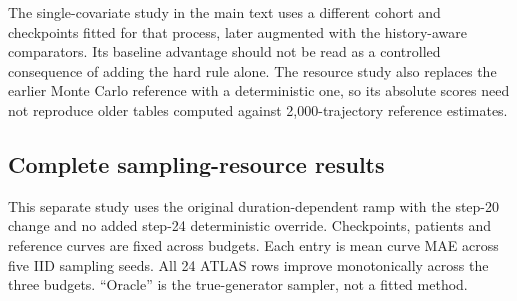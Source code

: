 The single-covariate study in the main text uses a different cohort and checkpoints fitted for that process, later augmented with the history-aware comparators. Its baseline advantage should not be read as a controlled consequence of adding the hard rule alone. The resource study also replaces the earlier Monte Carlo reference with a deterministic one, so its absolute scores need not reproduce older tables computed against 2,000-trajectory reference estimates.

\clearpage
\subsection{Complete sampling-resource results}\label{app:budgetresults}
This separate study uses the original duration-dependent ramp with the step-20 change and no added step-24 deterministic override. Checkpoints, patients and reference curves are fixed across budgets. Each entry is mean curve MAE across five IID sampling seeds. All 24 ATLAS rows improve monotonically across the three budgets. ``Oracle'' is the true-generator sampler, not a fitted method.
\small
